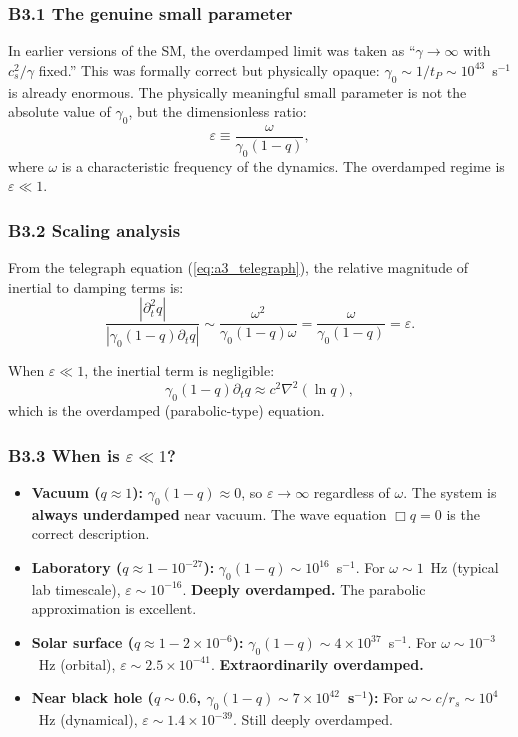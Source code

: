 \documentclass[reprint]{revtex4-2}
\begin{document}
\subsubsection{B3.1 The genuine small parameter}

In earlier versions of the SM, the overdamped limit was taken as ``$\gamma\to\infty$ with $c_s^2/\gamma$ fixed.'' This was formally correct but physically opaque: $\gamma_0 \sim 1/t_P \sim 10^{43}$~s$^{-1}$ is already enormous. The physically meaningful small parameter is not the absolute value of $\gamma_0$, but the dimensionless ratio:
\begin{equation}
\boxed{\varepsilon \equiv \frac{\omega}{\gamma_0(1-q)}},
\label{eq:epsilon_def}
\end{equation}
where $\omega$ is a characteristic frequency of the dynamics. The overdamped regime is $\varepsilon \ll 1$.

\subsubsection{B3.2 Scaling analysis}

From the telegraph equation (\ref{eq:a3_telegraph}), the relative magnitude of inertial to damping terms is:
\begin{equation}
\frac{|\partial_t^2 q|}{|\gamma_0(1-q)\partial_t q|} \sim \frac{\omega^2}{\gamma_0(1-q)\omega} = \frac{\omega}{\gamma_0(1-q)} = \varepsilon.
\end{equation}

When $\varepsilon \ll 1$, the inertial term is negligible:
\begin{equation}
\gamma_0(1-q)\partial_t q \approx c^2\nabla^2(\ln q),
\end{equation}
which is the overdamped (parabolic-type) equation.

\subsubsection{B3.3 When is $\varepsilon \ll 1$?}

\begin{itemize}
\item \textbf{Vacuum ($q\approx 1$):} $\gamma_0(1-q) \approx 0$, so $\varepsilon \to \infty$ regardless of $\omega$. The system is \textbf{always underdamped} near vacuum. The wave equation $\Box q = 0$ is the correct description.
\item \textbf{Laboratory ($q\approx 1-10^{-27}$):} $\gamma_0(1-q) \sim 10^{16}$~s$^{-1}$. For $\omega \sim 1$~Hz (typical lab timescale), $\varepsilon \sim 10^{-16}$. \textbf{Deeply overdamped.} The parabolic approximation is excellent.
\item \textbf{Solar surface ($q\approx 1-2\times 10^{-6}$):} $\gamma_0(1-q) \sim 4\times 10^{37}$~s$^{-1}$. For $\omega \sim 10^{-3}$~Hz (orbital), $\varepsilon \sim 2.5\times 10^{-41}$. \textbf{Extraordinarily overdamped.}
\item \textbf{Near black hole ($q\sim 0.6$, $\gamma_0(1-q)\sim 7\times 10^{42}$~s$^{-1}$):} For $\omega \sim c/r_s \sim 10^{4}$~Hz (dynamical), $\varepsilon \sim 1.4\times 10^{-39}$. Still deeply overdamped.
\end{itemize}
\end{document}
